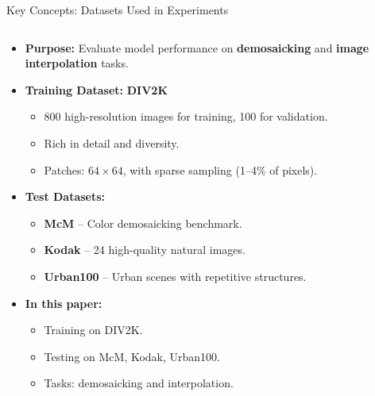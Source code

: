\documentclass[aspectratio=169,xcolor=dvipsnames]{beamer}
\begin{document}
\begin{frame}{Key Concepts: Datasets Used in Experiments}

\begin{columns}[c]

\begin{column}{0.7\textwidth}

\begin{itemize}

    \item \textbf{Purpose:}  
    Evaluate model performance on \textbf{demosaicking} and \textbf{image interpolation} tasks.

    \vspace{0.2cm}

    \item \textbf{Training Dataset:}  
    \textbf{DIV2K}  
    \begin{itemize}
        \item 800 high-resolution images for training, 100 for validation.
        \item Rich in detail and diversity.
        \item Patches: \(64 \times 64\), with sparse sampling (1–4\% of pixels).
    \end{itemize}

    \vspace{0.2cm}

    \item \textbf{Test Datasets:}  
    \begin{itemize}
        \item \textbf{McM} – Color demosaicking benchmark.
        \item \textbf{Kodak} – 24 high-quality natural images.
        \item \textbf{Urban100} – Urban scenes with repetitive structures.
    \end{itemize}

    \vspace{0.2cm}

    \item \textbf{In this paper:}  
    \begin{itemize}
        \item Training on DIV2K.  
        \item Testing on McM, Kodak, Urban100.  
        \item Tasks: demosaicking and interpolation.
    \end{itemize}


\end{itemize}
\end{column}
\end{columns}
\end{frame}
\end{document}
